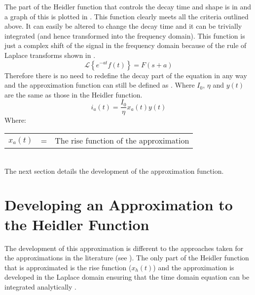 The part of the Heidler function that controls the decay time and shape is in  and a graph of this is plotted in . This function clearly meets all the criteria outlined above. It can easily be altered to change the decay time and it can be trivially integrated (and hence transformed into the frequency domain).
This function is just a complex shift of the signal in the frequency domain because of the rule of Laplace transforms shown in  \cite{bkSST,bkControl}.
\begin{equation}
    \mathcal{L} \left \{ e^{-at}f\left ( t \right ) \right \} = F \left (s + a \right )
    \label{eqn:laplaceComplexShift}
\end{equation}
Therefore there is no need to redefine the decay part of the equation in any way and the approximation function can still be defined as . Where $I_0$, $\eta$ and $y(t)$ are the same as those in the Heidler function.
\begin{equation}
i_a \left( t \right) = \frac{I_0}{\eta} x_a \left( t \right) y \left( t \right)
\label{eqn:PreTFSmall}
\end{equation}
Where: \\
\begin{tabular}{cll}
    $x_a \left( t \right)$ & = & The rise function of the approximation
\end{tabular}\\

The next section details the development of the approximation function.


\section{Developing an Approximation to the Heidler Function}
\label{sec:approx_methodology}
The development of this approximation is different to the approaches taken for the approximations in the literature (see ). The only part of the Heidler function that is approximated is the rise function ($x_h(t)$) and the approximation is developed in the Laplace domain ensuring that the time domain equation can be integrated analytically \cite{Terespolsky2014}.

